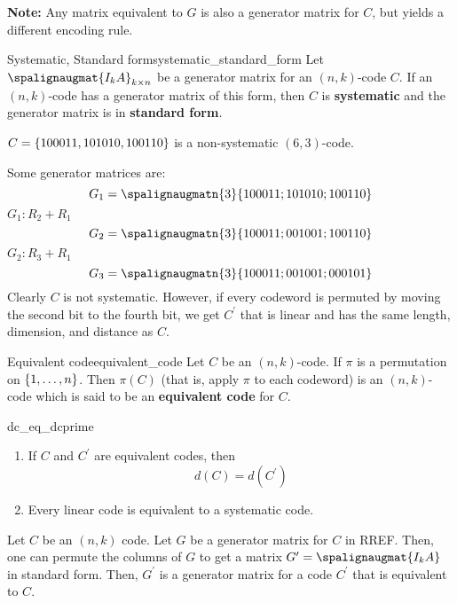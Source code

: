\textbf{Note:} Any matrix equivalent to $ G $ is also a generator matrix
for $ C $, but yields a different encoding rule.

\begin{Definition}{Systematic, Standard form}{systematic_standard_form}
    Let $ \spalignaugmat{I_k A}_{k\times n} $ be a generator matrix
    for an $ (n,k) $-code $ C $. If an $ (n,k) $-code has a generator
    matrix of this form, then $ C $ is \textbf{systematic} and the generator
    matrix is in \textbf{standard form}.
\end{Definition}

\begin{Example}{}{}
    $ C=\{100011,101010,100110\} $
    is a non-systematic $ (6,3) $-code.

    Some generator matrices are:
    \[ G_1=\spalignaugmatn{3}{
            1 0 0 0 1 1 ;
            1 0 1 0 1 0 ;
            1 0 0 1 1 0} \]
    $ G_1: R_2+R_1 $
    \[ G_2=\spalignaugmatn{3}{
            1 0 0 0 1 1 ;
            0 0 1 0 0 1 ;
            1 0 0 1 1 0} \]
    $ G_2: R_3+R_1 $
    \[ G_3=\spalignaugmatn{3}{
            1 0 0 0 1 1 ;
            0 0 1 0 0 1 ;
            0 0 0 1 0 1} \]
    Clearly $ C $ is not systematic. However, if every codeword
    is permuted by moving the second bit to the fourth bit, we get $ C^{\prime} $
    that is linear and has the same length, dimension, and distance as $ C $.
\end{Example}

\begin{Definition}{Equivalent code}{equivalent_code}
    Let $ C $ be an $ (n,k) $-code. If $ \pi $ is a permutation on
    $ \{1,\ldots ,n\} $. Then $ \pi(C) $ (that is, apply $ \pi $ to each
    codeword) is an $ (n,k) $-code which is said to be an \textbf{equivalent code}
    for $ C $.
\end{Definition}

\begin{Theorem}{}{dc_eq_dcprime}
    \begin{enumerate}[label=(\arabic*)]
        \item If $ C $ and $ C^{\prime} $ are equivalent codes, then
              \[ d(C)=d(C^{\prime}) \]
        \item Every linear code is equivalent to a systematic code.
    \end{enumerate}
\end{Theorem}

\begin{Proof}{}{}
    Let $ C $ be an $ (n,k) $ code. Let $ G $ be a generator matrix for $ C $
    in RREF\@. Then, one can permute the columns of $ G $ to get a matrix
    $ G^{\prime}=\spalignaugmat{I_k A} $ in standard form. Then,
    $ G^{\prime} $ is a generator matrix for a code $ C^{\prime} $ that is
    equivalent to $ C $.
\end{Proof}

